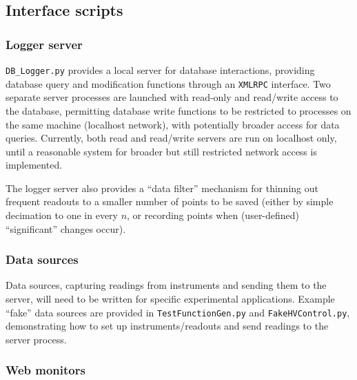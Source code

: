 \documentclass[12pt,english]{article}
\newcommand{\cd}[1]{\texttt{#1}}
\begin{document}
%
%
\subsection{Interface scripts}

%
\subsubsection{Logger server}

\cd{DB\_Logger.py} provides a local server for database interactions, providing database query and modification functions
	through an \cd{XMLRPC} interface.
Two separate server processes are launched with read-only and read/write access to the database,
	permitting database write functions to be restricted to processes on the same machine (localhost network),
	with potentially broader access for data queries.
Currently, both read and read/write servers are run on localhost only,
	until a reasonable system for broader but still restricted network access is implemented.

The logger server also provides a ``data filter'' mechanism for thinning out frequent readouts
	to a smaller number of points to be saved
	(either by simple decimation to one in every $n$,
	or recording points when (user-defined) ``significant'' changes occur).

%
\subsubsection{Data sources}

Data sources, capturing readings from instruments and sending them to the server,
	will need to be written for specific experimental applications.
Example ``fake'' data sources are provided in \cd{TestFunctionGen.py} and \cd{FakeHVControl.py},
	demonstrating how to set up instruments/readouts and send readings to the server process.

%
\subsubsection{Web monitors}
\end{document}
